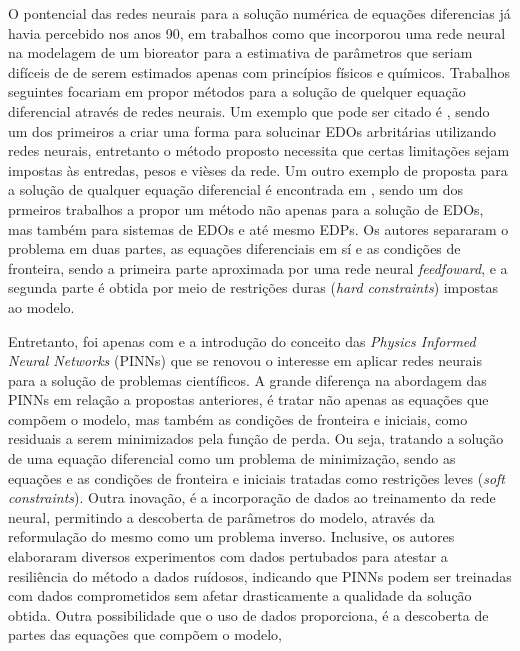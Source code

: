 O pontencial das redes neurais para a solução numérica de equações diferencias 
já havia percebido nos anos 90, em trabalhos como \cite{psichogios-etal:92} que
incorporou uma rede neural na modelagem de um bioreator para a estimativa de
parâmetros que seriam difíceis de de serem estimados apenas com princípios físicos 
e químicos. Trabalhos seguintes focariam em propor métodos para a solução de 
quelquer equação diferencial através de redes neurais. 
Um exemplo que pode ser citado é \cite{meade-fernandez:94}, sendo um dos 
primeiros a criar uma forma para solucinar EDOs arbritárias utilizando redes 
neurais, entretanto o método proposto necessita que certas limitações sejam
impostas às entredas, pesos e vièses da rede. 
Um outro exemplo de proposta para a solução de qualquer equação diferencial é
encontrada  em \cite{lagaris-etal:98}, sendo um dos prmeiros trabalhos a 
propor um método não apenas para a solução de EDOs, mas também para sistemas 
de EDOs e até mesmo EDPs.
Os autores separaram o problema em duas partes, as equações diferenciais em sí e 
as condições de fronteira, sendo a primeira parte aproximada por uma rede neural
\textit{feedfoward}, e a segunda parte é obtida por meio de restrições duras 
(\textit{hard constraints}) impostas ao modelo.

Entretanto, foi apenas com \cite{raissi-etal:19} e a introdução do conceito das 
\textit{Physics Informed Neural Networks} (PINNs) que se renovou o interesse 
em aplicar redes neurais para a solução de problemas científicos.
A grande diferença na abordagem das PINNs em relação a propostas anteriores, 
é tratar não apenas as equações que compõem o modelo, mas também as condições
de fronteira e iniciais, como residuais a serem minimizados pela função de perda.
Ou seja, tratando a solução de uma equação diferencial como um problema de
minimização, sendo as equações e as condições de fronteira e iniciais tratadas 
como restrições leves (\textit{soft constraints}). 
Outra inovação, é a incorporação de dados ao treinamento da rede neural, 
permitindo a descoberta de parâmetros do modelo, através da reformulação do 
mesmo como um problema inverso.
Inclusive, os autores elaboraram diversos experimentos com dados pertubados
para atestar a resiliência do método a dados ruídosos, indicando que PINNs
podem ser treinadas com dados comprometidos sem afetar drasticamente a qualidade
da solução obtida.
Outra possibilidade que o uso de dados proporciona,
é a descoberta de partes das equações que compõem o modelo,  

